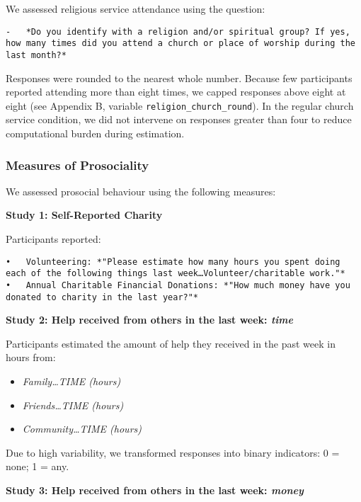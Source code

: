 \documentclass[
  single column]{article}
\providecommand{\tightlist}{%
  \setlength{\itemsep}{0pt}\setlength{\parskip}{0pt}}\usepackage{longtable,booktabs,array}
\begin{document}
We assessed religious service attendance using the question:

\begin{verbatim}
-   *Do you identify with a religion and/or spiritual group? If yes, how many times did you attend a church or place of worship during the last month?*
\end{verbatim}

Responses were rounded to the nearest whole number. Because few
participants reported attending more than eight times, we capped
responses above eight at eight (see Appendix B, variable
\texttt{religion\_church\_round}). In the regular church service
condition, we did not intervene on responses greater than four to reduce
computational burden during estimation.

\subsubsection{Measures of Prosociality}\label{measures-of-prosociality}

We assessed prosocial behaviour using the following measures:

\textbf{Study 1: Self-Reported Charity}

Participants reported:

\begin{verbatim}
•   Volunteering: *"Please estimate how many hours you spent doing each of the following things last week…Volunteer/charitable work."*
•   Annual Charitable Financial Donations: *"How much money have you donated to charity in the last year?"*
\end{verbatim}

\textbf{Study 2: Help received from others in the last week: \emph{time}
}

Participants estimated the amount of help they received in the past week
in hours from:

\begin{itemize}
\tightlist
\item
  \emph{Family\ldots TIME (hours)}
\item
  \emph{Friends\ldots TIME (hours)}
\item
  \emph{Community\ldots TIME (hours)}
\end{itemize}

Due to high variability, we transformed responses into binary
indicators: 0 = none; 1 = any.

\textbf{Study 3: Help received from others in the last week:
\emph{money} }
\end{document}
